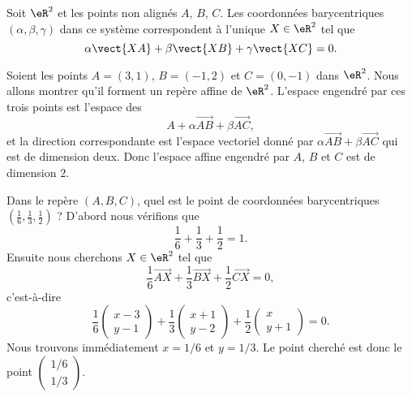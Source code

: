 \begin{normaltext}      \label{NORMooOGHBooMjmouu}
	Soit \( \eR^2\) et les points non alignés \( A\), \( B\), \( C\). Les coordonnées barycentriques \( (\alpha,\beta,\gamma)\) dans ce système correspondent à l'unique \( X\in \eR^2\) tel que
	\begin{equation}
		\alpha \vect{ XA }+\beta\vect{ XB }+\gamma\vect{ XC }=0.
	\end{equation}
\end{normaltext}

\begin{example}
	Soient les points \( A=(3,1)\), \( B=(-1,2)\) et \( C=(0,-1)\) dans \( \eR^2\). Nous allons montrer qu'il forment un repère affine de \( \eR^2\). L'espace engendré par ces trois points est l'espace des
	\begin{equation}
		A+\alpha\overrightarrow{ AB }+\beta\overrightarrow{ AC },
	\end{equation}
	et la direction correspondante est l'espace vectoriel donné par \( \alpha\overrightarrow{ AB }+\beta\overrightarrow{ AC }\) qui est de dimension deux. Donc l'espace affine engendré par \( A\), \( B\) et \( C\) est de dimension \( 2\).
\end{example}

\begin{example}
	Dans le repère \( (A,B,C)\), quel est le point de coordonnées barycentriques \( (\frac{1}{ 6 },\frac{1}{ 3 },\frac{1}{ 2 })\) ? D'abord nous vérifions que
	\begin{equation}
		\frac{1}{ 6 }+\frac{1}{ 3 }+\frac{1}{ 2 }=1.
	\end{equation}
	Ensuite nous cherchons \( X\in \eR^2\) tel que
	\begin{equation}
		\frac{1}{ 6 }\overrightarrow{ AX }+\frac{1}{ 3 }\overrightarrow{ BX }+\frac{1}{ 2 }\overrightarrow{ CX }=0,
	\end{equation}
	c'est-à-dire
	\begin{equation}
		\frac{1}{ 6 }\begin{pmatrix}
			x-3 \\
			y-1
		\end{pmatrix}+\frac{1}{ 3 }\begin{pmatrix}
			x+1 \\
			y-2
		\end{pmatrix}+\frac{1}{ 2 }\begin{pmatrix}
			x \\
			y+1
		\end{pmatrix}=0.
	\end{equation}
	Nous trouvons immédiatement \( x=1/6\) et \( y=1/3\). Le point cherché est donc le point \( \begin{pmatrix}
		1/6 \\
		1/3
	\end{pmatrix}\).
\end{example}

